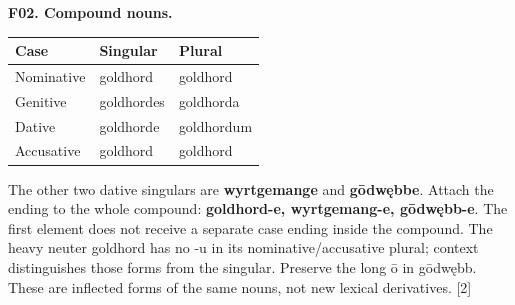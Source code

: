 \par\begin{minipage}{\linewidth}\raggedright
\textbf{F02. Compound nouns.}

\par\begingroup
\fontsize{10.5}{13.2}\selectfont
\setlength{\LTleft}{0pt}\setlength{\LTright}{\fill}
\noindent
\begin{tabular}{@{}>{\raggedright\arraybackslash}p{39.46mm}>{\raggedright\arraybackslash}p{39.46mm}>{\raggedright\arraybackslash}p{39.46mm}@{}}
\toprule
\textbf{Case} & \textbf{Singular} & \textbf{Plural} \\
\midrule
Nominative & goldhord & goldhord \\
Genitive & goldhordes & goldhorda \\
Dative & goldhorde & goldhordum \\
Accusative & goldhord & goldhord \\
\bottomrule
\end{tabular}
\par\endgroup

The other two dative singulars are \textbf{wyrtgemange} and \textbf{gōdwębbe}. Attach the ending to the whole compound: \textbf{goldhord-e, wyrtgemang-e, gōdwębb-e}. The first element does not receive a separate case ending inside the compound. The heavy neuter goldhord has no -u in its nominative/\allowbreak{}accusative plural; context distinguishes those forms from the singular. Preserve the long ō in gōdwębb. These are inflected forms of the same nouns, not new lexical derivatives. [2]

\end{minipage}\par\addvspace{4pt}

